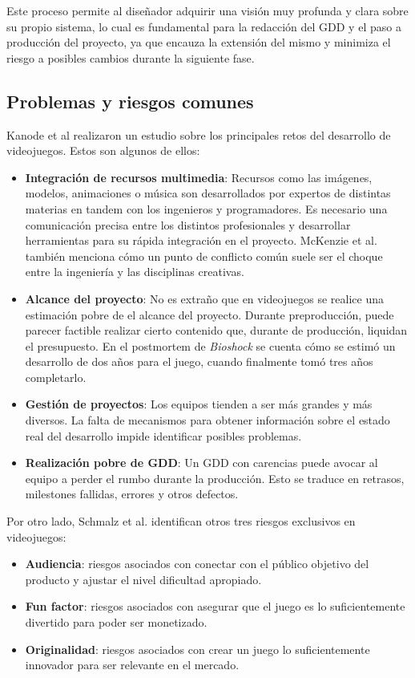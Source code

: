 Este proceso permite al diseñador adquirir una visión muy profunda y clara sobre su propio sistema, lo cual es fundamental para la redacción del GDD y el paso a producción del proyecto, ya que encauza la extensión del mismo y minimiza el riesgo a posibles cambios durante la siguiente fase.

\subsection{Problemas y riesgos comunes}

Kanode et al\cite{kanode} realizaron un estudio sobre los principales retos del desarrollo de videojuegos. Estos son algunos de ellos:

\begin{itemize}
    \item \textbf{Integración de recursos multimedia}: Recursos como las imágenes, modelos, animaciones o música son desarrollados por expertos de distintas materias en tandem con los ingenieros y programadores. Es necesario una comunicación precisa entre los distintos profesionales y desarrollar herramientas para su rápida integración en el proyecto. McKenzie et al. también menciona cómo un punto de conflicto común suele ser el choque entre la ingeniería y las disciplinas creativas.
    \item \textbf{Alcance del proyecto}: No es extraño que en videojuegos se realice una estimación pobre de el alcance del proyecto. Durante preproducción, puede parecer factible realizar cierto contenido que, durante de producción, liquidan el presupuesto. En el postmortem de \textit{Bioshock}\cite{bioshock} se cuenta cómo se estimó un desarrollo de dos años para el juego, cuando finalmente tomó tres años completarlo.
    \item \textbf{Gestión de proyectos}: Los equipos tienden a ser más grandes y más diversos. La falta de mecanismos para obtener información sobre el estado real del desarrollo impide identificar posibles problemas.
    \item \textbf{Realización pobre de GDD}: Un GDD con carencias puede avocar al equipo a perder el rumbo durante la producción. Esto se traduce en retrasos, milestones fallidas, errores y otros defectos.
\end{itemize}

Por otro lado, Schmalz et al. identifican otros tres riesgos exclusivos en videojuegos:

\begin{itemize}
    \item \textbf{Audiencia}: riesgos asociados con conectar con el público objetivo del producto y ajustar el nivel dificultad apropiado.
    \item \textbf{Fun factor}: riesgos asociados con asegurar que el juego es lo suficientemente divertido para poder ser monetizado.
    \item \textbf{Originalidad}: riesgos asociados con crear un juego lo suficientemente innovador para ser relevante en el mercado.
\end{itemize}

